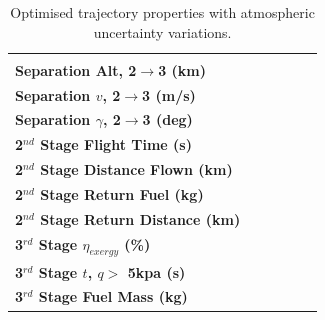 \begin{table}[ht]
\begin{tabular}{l c c c c c}
		& \textbf{\secondExergyEffMaxTGroundMaxTStrat}
		\\
		\textbf{Separation Alt, 2$\rightarrow$3 (km)}
		& \secondthirdSeparationAltqStandard
		& \secondthirdSeparationAltMinTGroundMinTStrat
		& \secondthirdSeparationAltMaxTGroundMinTStrat
		& \secondthirdSeparationAltMinTGroundMaxTStrat
		& \secondthirdSeparationAltMaxTGroundMaxTStrat
		\\
		\textbf{Separation $v$, 2$\rightarrow$3 (m/s)}
		& \secondthirdSeparationvqStandard
		& \secondthirdSeparationvMinTGroundMinTStrat
		& \secondthirdSeparationvMaxTGroundMinTStrat
		& \secondthirdSeparationvMinTGroundMaxTStrat
		& \secondthirdSeparationvMaxTGroundMaxTStrat
		\\
		\textbf{Separation $\gamma$, 2$\rightarrow$3 (deg)}
		& \secondthirdSeparationgammaqStandard
		& \secondthirdSeparationgammaMinTGroundMinTStrat
		& \secondthirdSeparationgammaMaxTGroundMinTStrat
		& \secondthirdSeparationgammaMinTGroundMaxTStrat
		& \secondthirdSeparationgammaMaxTGroundMaxTStrat
		\\
		\textbf{2$^{nd}$ Stage Flight Time (s)}
		& \secondFlightTimeqStandard
		& \secondFlightTimeMinTGroundMinTStrat
		& \secondFlightTimeMaxTGroundMinTStrat
		& \secondFlightTimeMinTGroundMaxTStrat
		& \secondFlightTimeMaxTGroundMaxTStrat
		\\
		\textbf{2$^{nd}$ Stage Distance Flown (km)}
		& \SecondDistqStandard
		& \SecondDistMinTGroundMinTStrat
		& \SecondDistMaxTGroundMinTStrat
		& \SecondDistMinTGroundMaxTStrat
		& \SecondDistMaxTGroundMaxTStrat
		\\
		\textbf{2$^{nd}$ Stage Return Fuel (kg)}
		& \returnFuelqStandard
		& \returnFuelMinTGroundMinTStrat
		& \returnFuelMaxTGroundMinTStrat
		& \returnFuelMinTGroundMaxTStrat
		& \returnFuelMaxTGroundMaxTStrat
		\\
		\textbf{2$^{nd}$ Stage Return Distance (km)}
		& \returnDistqStandard
		& \returnDistMinTGroundMinTStrat
		& \returnDistMaxTGroundMinTStrat
		& \returnDistMinTGroundMaxTStrat
		& \returnDistMaxTGroundMaxTStrat
		\\
		\hline 
		\textbf{3$^{rd}$ Stage $\eta_{exergy}$ (\%)}
		& \textbf{\thirddExergyEffqStandard}
		& \textbf{\thirddExergyEffMinTGroundMinTStrat}
		& \textbf{\thirddExergyEffMaxTGroundMinTStrat}
		& \textbf{\thirddExergyEffMinTGroundMaxTStrat}
		& \textbf{\thirddExergyEffMaxTGroundMaxTStrat}
		\\
		\textbf{3$^{rd}$ Stage $t$, $q >$ 5kpa (s)}
		& \thirdqOverFiveqStandard
		& \thirdqOverFiveMinTGroundMinTStrat
		& \thirdqOverFiveMaxTGroundMinTStrat
		& \thirdqOverFiveMinTGroundMaxTStrat
		& \thirdqOverFiveMaxTGroundMaxTStrat
		\\
		\textbf{3$^{rd}$ Stage Fuel Mass (kg)}
		& \thirdmFuelqStandard
		& \thirdmFuelMinTGroundMinTStrat
		& \thirdmFuelMaxTGroundMinTStrat
		& \thirdmFuelMinTGroundMaxTStrat
		& \thirdmFuelMaxTGroundMaxTStrat
		\\
		\hline 
	\end{tabular} 
	

	\caption{Optimised trajectory properties with atmospheric uncertainty variations.}
		\label{tab:atmunc}
	
\end{table}
